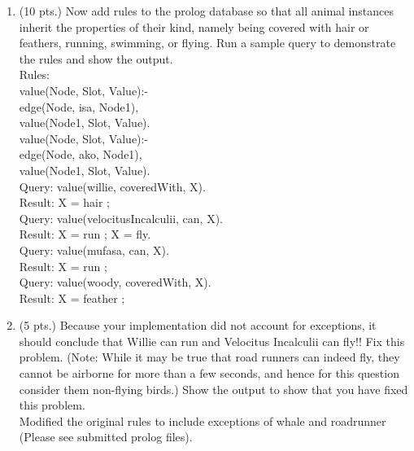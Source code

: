 \documentclass{article}%
\begin{document}
\begin{enumerate}
\begin{enumerate}
		\item (10 pts.) Now add rules to the prolog database so that all animal instances inherit the properties of their kind, namely being covered with hair or feathers, running, swimming, or flying. Run a sample query to demonstrate the rules and show the output.\\
		
		Rules: \\
		value(Node, Slot, Value):- \\
    	\hspace*{6ex} edge(Node, isa, Node1), \\
    	\hspace*{6ex} value(Node1, Slot, Value).\\
		value(Node, Slot, Value):-\\
   		\hspace*{6ex} edge(Node, ako, Node1),\\
    	\hspace*{6ex} value(Node1, Slot, Value).\\
		
		Query: value(willie, coveredWith, X).\\
		Result: X = hair ;\\
		
		Query: value(velocitusIncalculii, can, X). \\
		Result: X = run ; X = fly. \\
		
		Query: value(mufasa, can, X).\\
		Result: X = run ;\\
		
		Query: value(woody, coveredWith, X).\\
		Result: X = feather ;\\
		
		
		
		\item (5 pts.) Because your implementation did not account for exceptions, it should conclude that Willie can run and Velocitus Incalculii can fly!! Fix this problem. (Note: While it may be true that road runners can indeed fly, they cannot be airborne for more than a few seconds, and hence for this question consider them non-flying birds.) Show the output to show that you have fixed this problem. \\
		
		Modified the original rules to include exceptions of whale and roadrunner (Please see submitted prolog files).\\
		

\end{enumerate}
\end{enumerate}
\end{document}
